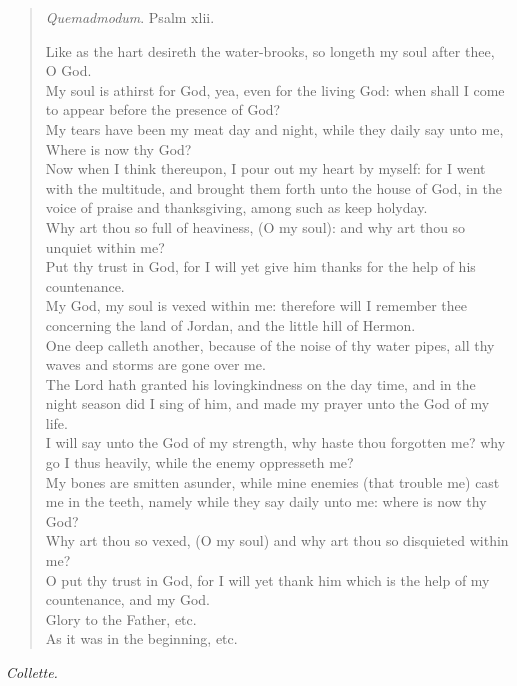 \documentclass[
]{book}
\begin{document}
\begin{quote}
\emph{Quemadmodum}. Psalm xlii.

Like as the hart desireth the water-brooks, so longeth my soul after thee, O God.\\
My soul is athirst for God, yea, even for the living God: when shall I come to appear before the presence of God?\\
My tears have been my meat day and night, while they daily say unto me, Where is now thy God?\\
Now when I think thereupon, I pour out my heart by myself: for I went with the multitude, and brought them forth unto the house of God, in the voice of praise and thanksgiving, among such as keep holyday.\\
Why art thou so full of heaviness, (O my soul): and why art thou so unquiet within me?\\
Put thy trust in God, for I will yet give him thanks for the help of his countenance.\\
My God, my soul is vexed within me: therefore will I remember thee concerning the land of Jordan, and the little hill of Hermon.\\
One deep calleth another, because of the noise of thy water pipes, all thy waves and storms are gone over me.\\
The Lord hath granted his lovingkindness on the day time, and in the night season did I sing of him, and made my prayer unto the God of my life.\\
I will say unto the God of my strength, why haste thou forgotten me? why go I thus heavily, while the enemy oppresseth me?\\
My bones are smitten asunder, while mine enemies (that trouble me) cast me in the teeth, namely while they say daily unto me: where is now thy God?\\
Why art thou so vexed, (O my soul) and why art thou so disquieted within me?\\
O put thy trust in God, for I will yet thank him which is the help of my countenance, and my God.\\
Glory to the Father, etc.\\
As it was in the beginning, etc.
\end{quote}

\begin{center}
\emph{Collette.}

\end{center}
\end{document}

